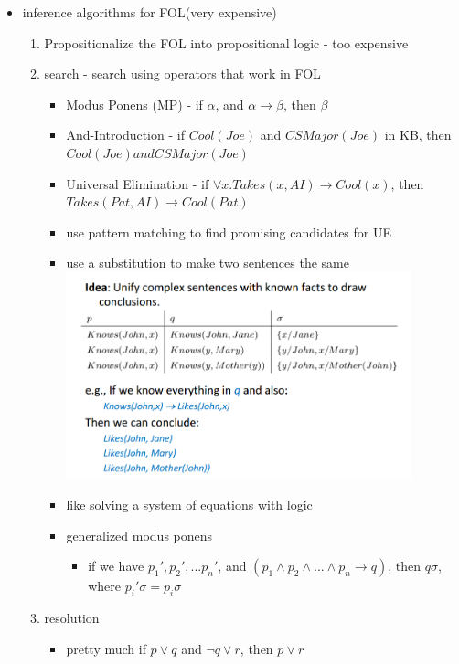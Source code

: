 \documentclass[11pt]{article}
\newcommand{\ee}[1]{\ensuremath{#1}}
\begin{document}
\begin{description}
\begin{itemize}
\begin{itemize}
		\item inference algorithms for FOL(very expensive)
		\begin{enumerate}
			\item Propositionalize the FOL into propositional logic - too expensive
			
			\item search - search using operators that work in FOL
			\begin{itemize}
				\item Modus Ponens (MP) - if \ee{\alpha}, and \ee{\alpha \rightarrow \beta}, then \ee{\beta}
				\item And-Introduction - if \ee{Cool(Joe)} and \ee{CSMajor(Joe)} in KB, then \ee{Cool(Joe) and CSMajor(Joe)}
				\item Universal Elimination - if \ee{\forall x. Takes(x, AI) \rightarrow Cool(x)}, then \ee{Takes(Pat,AI) \rightarrow Cool(Pat)}
				
				\item use pattern matching to find promising candidates for UE
				\item use a substitution to make two sentences the same
				\\ \includegraphics[width=100mm,scale=1]{unification}
				\item like solving a system of equations with logic
				
				\item generalized modus ponens
				\begin{itemize}
					\item if we have \ee{p_1', p_2',...p_n'}, and \ee{(p_1 \wedge p_2 \wedge ... \wedge p_n \rightarrow q)}, then \ee{q\sigma}, where \ee{p_i'\sigma = p_i \sigma}
				\end{itemize}
				
			\end{itemize}
		
			\item resolution
			\begin{itemize}
				\item pretty much if \ee{p \vee q} and \ee{\lnot q \vee r}, then \ee{p \vee r}
	

\end{itemize}
\end{enumerate}
\end{itemize}
\end{itemize}
\end{description}
\end{document}
